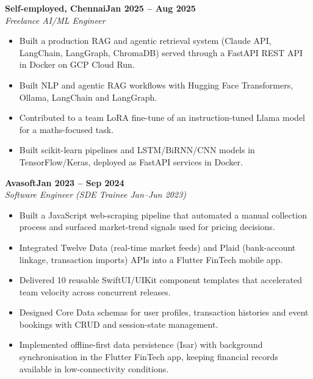 \documentclass[a4paper,11pt]{article}
\newcommand{\entry}[4]{\needspace{4\baselineskip}\noindent\textbf{#1}\hfill\textbf{#2}\\ \textit{#3}\hfill\textit{#4}\par}
\begin{document}
\vspace{4pt}
\entry{Self-employed, Chennai}{Jan 2025 – Aug 2025}{Freelance AI/ML Engineer}{}
\begin{itemize}
  \item Built a production RAG and agentic retrieval system (Claude API, LangChain, LangGraph, ChromaDB) served through a FastAPI REST API in Docker on GCP Cloud Run.
  \item Built NLP and agentic RAG workflows with Hugging Face Transformers, Ollama, LangChain and LangGraph.
  \item Contributed to a team LoRA fine-tune of an instruction-tuned Llama model for a maths-focused task.
  \item Built scikit-learn pipelines and LSTM/BiRNN/CNN models in TensorFlow/Keras, deployed as FastAPI services in Docker.
\end{itemize}
\vspace{4pt}
\entry{Avasoft}{Jan 2023 – Sep 2024}{Software Engineer (SDE Trainee Jan–Jun 2023)}{}
\begin{itemize}
  \item Built a JavaScript web-scraping pipeline that automated a manual collection process and surfaced market-trend signals used for pricing decisions.
  \item Integrated Twelve Data (real-time market feeds) and Plaid (bank-account linkage, transaction imports) APIs into a Flutter FinTech mobile app.
  \item Delivered 10 reusable SwiftUI/UIKit component templates that accelerated team velocity across concurrent releases.
  \item Designed Core Data schemas for user profiles, transaction histories and event bookings with CRUD and session-state management.
  \item Implemented offline-first data persistence (Isar) with background synchronisation in the Flutter FinTech app, keeping financial records available in low-connectivity conditions.
\end{itemize}

\end{document}
